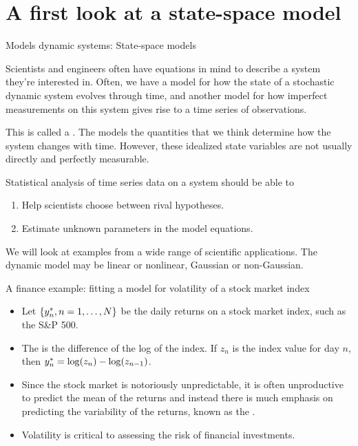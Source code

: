 \section{A first look at a state-space model}

\begin{frame}{Models dynamic systems: State-space models}

Scientists and engineers often have equations in mind to describe a system they're interested in.
Often, we have a model for how the state of a stochastic dynamic system evolves through time, and another model for how imperfect measurements on this system gives rise to a time series of observations. 

This is called a . The  models the quantities that we think determine how the system changes with time. However, these idealized state variables are not usually directly and perfectly measurable. 

Statistical analysis of time series data on a system should be able to 

\begin{enumerate}
\item  Help scientists choose between rival hypotheses.

\item Estimate unknown parameters in the model equations.
\end{enumerate}

We will look at examples from a wide range of scientific applications. The dynamic model may be linear or nonlinear, Gaussian or non-Gaussian.  

\end{frame}

\begin{frame}{A finance example: fitting a model for volatility of a stock market index}

\begin{itemize}

\item Let $\{y_n^*,n=1,\dots,N\}$ be the daily returns on a stock market index, such as the S\&P 500.

\item The  is the difference of the log of the index. If $z_n$ is the index value for day $n$, then $y_n^* = \log(z_n)-\log(z_{n-1})$.

\item Since the stock market is notoriously unpredictable, it is often unproductive to predict the mean of the returns and instead there is much emphasis on predicting the variability of the returns, known as the .

\item Volatility is critical to assessing the risk of financial investments.

\end{itemize}

\end{frame}

